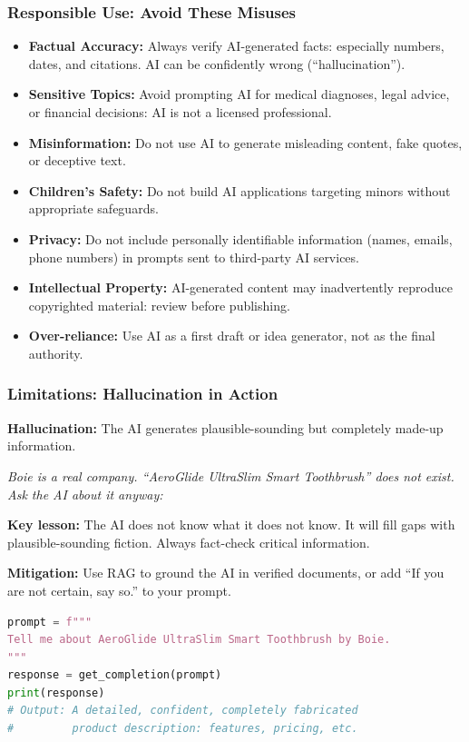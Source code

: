 \begin{frame}[fragile]\frametitle{Responsible Use: Avoid These Misuses}

\begin{itemize}
\item \textbf{Factual Accuracy:} Always verify AI-generated facts: especially numbers, dates, and citations. AI can be confidently wrong (``hallucination'').
\item \textbf{Sensitive Topics:} Avoid prompting AI for medical diagnoses, legal advice, or financial decisions: AI is not a licensed professional.
\item \textbf{Misinformation:} Do not use AI to generate misleading content, fake quotes, or deceptive text.
\item \textbf{Children's Safety:} Do not build AI applications targeting minors without appropriate safeguards.
\item \textbf{Privacy:} Do not include personally identifiable information (names, emails, phone numbers) in prompts sent to third-party AI services.
\item \textbf{Intellectual Property:} AI-generated content may inadvertently reproduce copyrighted material: review before publishing.
\item \textbf{Over-reliance:} Use AI as a first draft or idea generator, not as the final authority.
\end{itemize}	 

\end{frame}


\begin{frame}[fragile]\frametitle{Limitations: Hallucination in Action}

\textbf{Hallucination:} The AI generates plausible-sounding but completely made-up information.

\medskip
\emph{Boie is a real company. ``AeroGlide UltraSlim Smart Toothbrush'' does not exist. Ask the AI about it anyway:}

\textbf{Key lesson:} The AI does not know what it does not know. It will fill gaps with plausible-sounding fiction. Always fact-check critical information.

\textbf{Mitigation:} Use RAG to ground the AI in verified documents, or add ``If you are not certain, say so.'' to your prompt.

\begin{lstlisting}[language=Python]
prompt = f"""
Tell me about AeroGlide UltraSlim Smart Toothbrush by Boie.
"""
response = get_completion(prompt)
print(response)
# Output: A detailed, confident, completely fabricated 
#         product description: features, pricing, etc.
\end{lstlisting}

		
\end{frame}

